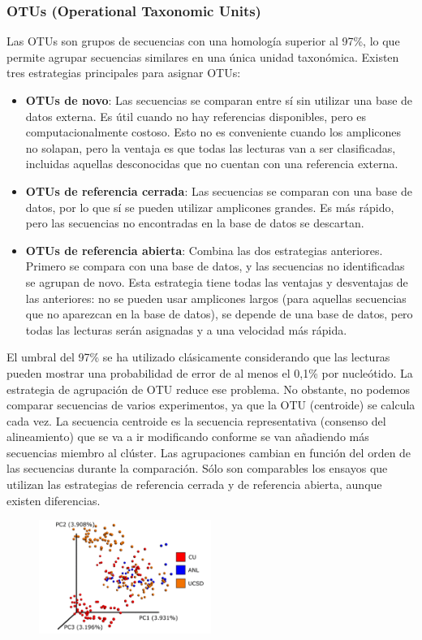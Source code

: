 \subsubsection{OTUs (Operational Taxonomic Units)}
Las OTUs son grupos de secuencias con una homología superior al 97\%, lo que permite agrupar secuencias similares en una única unidad taxonómica. Existen tres estrategias principales para asignar OTUs:
\begin{itemize}
\item \textbf{OTUs de novo}: Las secuencias se comparan entre sí sin utilizar una base de datos externa. Es útil cuando no hay referencias disponibles, pero es computacionalmente costoso. Esto no es conveniente cuando los amplicones no solapan, pero la ventaja es que todas las lecturas van a ser clasificadas, incluidas aquellas desconocidas que no cuentan con una referencia externa.
\item \textbf{OTUs de referencia cerrada}: Las secuencias se comparan con una base de datos, por lo que sí se pueden utilizar amplicones grandes. Es más rápido, pero las secuencias no encontradas en la base de datos se descartan.
\item \textbf{OTUs de referencia abierta}: Combina las dos estrategias anteriores. Primero se compara con una base de datos, y las secuencias no identificadas se agrupan de novo. Esta estrategia tiene todas las ventajas y desventajas de las anteriores: no se pueden usar amplicones largos (para aquellas secuencias que no aparezcan en la base de datos), se depende de una base de datos, pero todas las lecturas serán asignadas y a una velocidad más rápida. 
\end{itemize}

El umbral del 97\% se ha utilizado clásicamente considerando que las lecturas pueden mostrar una probabilidad de error de al menos el 0,1\% por nucleótido.
La estrategia de agrupación de OTU reduce ese problema. No obstante, no podemos comparar secuencias de varios experimentos, ya que la OTU (centroide) se calcula cada vez.
La secuencia centroide es la secuencia representativa (consenso del alineamiento) que se va a ir modificando conforme se van añadiendo más secuencias miembro al clúster. Las agrupaciones cambian en función del orden de las secuencias durante la comparación.
Sólo son comparables los ensayos que utilizan las estrategias de referencia cerrada y de referencia abierta, aunque existen diferencias.

\begin{figure}[h]
\centering
\includegraphics[width = 0.5\textwidth]{figs/PCA-OTU.png}
\end{figure}

